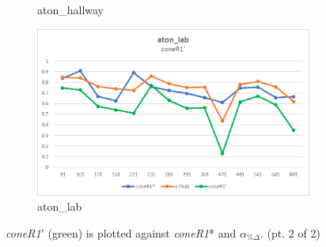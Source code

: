 \begin{appendices}
\begin{figure}
\begin{subfigure}{.45\linewidth}
  \caption{aton\_hallway}
\end{subfigure}
\hfill
\begin{subfigure}{.45\linewidth}
  \includegraphics[width=1\linewidth]{figures/appendix/lab_prime.jpg}
  \caption{aton\_lab}
\end{subfigure}
\caption{\textit{coneR1}$'$ (green) is plotted against \textit{coneR1}* and $\alpha_{\%\Delta}$. (pt. 2 of 2)}

\end{figure}


\end{appendices}
